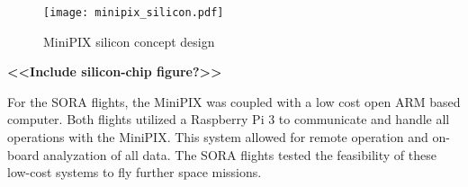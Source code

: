 \begin{figure}[h]
    \centering
    \texttt{[image: minipix\_silicon.pdf]}
    \caption{MiniPIX silicon concept design}
    \label{fig:minipix_silicon}
\end{figure}
%
\textbf{<<Include silicon-chip figure?>>}
%

For the SORA flights, the MiniPIX was coupled with a low cost open ARM based computer.  Both flights utilized a Raspberry Pi 3 to communicate and handle all operations with the MiniPIX.  This system allowed for remote operation and on-board analyzation of all data.  The SORA flights tested the feasibility of these low-cost systems to fly further space missions.  